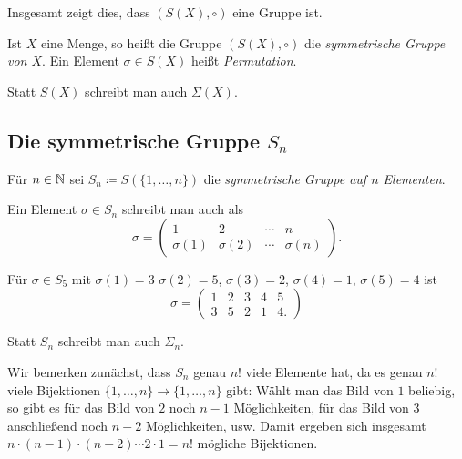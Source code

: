 Insgesamt zeigt dies, dass $(S(X), \circ)$ eine Gruppe ist.

\begin{defi}
 Ist $X$ eine Menge, so heißt die Gruppe $(S(X), \circ)$ die \emph{symmetrische Gruppe von $X$}. Ein Element $\sigma \in S(X)$ heißt \emph{Permutation}.
\end{defi}


\begin{bem}
 Statt $S(X)$ schreibt man auch $\Sigma(X)$.
\end{bem}


\subsection{Die symmetrische Gruppe \texorpdfstring{$S_n$}{Sn}}
\begin{defi}
 Für $n \in \mathbb{N}$ sei $S_n \coloneqq S(\{1, \dotsc, n\})$ die \emph{symmetrische Gruppe auf $n$ Elementen}.
\end{defi}

Ein Element $\sigma \in S_n$ schreibt man auch als
\[
 \sigma
 =
 \begin{pmatrix}
  1         & 2         & \cdots & n \\
  \sigma(1) & \sigma(2) & \cdots & \sigma(n)
 \end{pmatrix}.
\]

\begin{bsp}
 Für $\sigma \in S_5$ mit $\sigma(1) = 3$ $\sigma(2) = 5$, $\sigma(3) = 2$, $\sigma(4) = 1$, $\sigma(5) = 4$ ist
 \[
  \sigma =
  \begin{pmatrix}
   1 & 2 & 3 & 4 & 5 \\
   3 & 5 & 2 & 1 & 4.
  \end{pmatrix}
 \]
\end{bsp}


\begin{bem}
 Statt $S_n$ schreibt man auch $\Sigma_n$.
\end{bem}

Wir bemerken zunächst, dass $S_n$ genau $n!$ viele Elemente hat, da es genau $n!$ viele Bijektionen $\{1, \dotsc, n\} \to \{1, \dotsc, n\}$ gibt: Wählt man das Bild von $1$ beliebig, so gibt es für das Bild von $2$ noch $n-1$ Möglichkeiten, für das Bild von $3$ anschließend noch $n-2$ Möglichkeiten, usw. Damit ergeben sich insgesamt $n \cdot (n-1) \cdot (n-2) \dotsm 2 \cdot 1 = n!$ mögliche Bijektionen.

